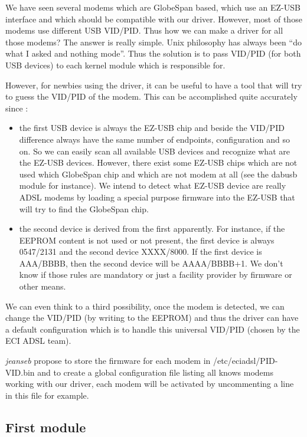 \documentclass[a4paper,12pt]{article}
\begin{document}
We have seen several modems which are GlobeSpan based, which use an
EZ-USB interface and which should be compatible with our driver.
However, most of those modems use different USB VID/PID. Thus how we
can make a driver for all those modems? The answer is really simple.
Unix philosophy has always been ``do what I asked and nothing mode''.
Thus the solution is to pass VID/PID (for both USB devices) to each
kernel module which is responsible for.

However, for newbies using the driver, it can be useful to have a
tool that will try to guess the VID/PID of the modem. This can be
accomplished quite accurately since :

\begin{itemize}
  
\item the first USB device is always the EZ-USB chip and beside the
  VID/PID difference always have the same number of endpoints,
  configuration and so on. So we can easily scan all available USB
  devices and recognize what are the EZ-USB devices. However, there
  exist some EZ-USB chips which are not used which GlobeSpan chip and
  which are not modem at all (see the dabusb module for instance). We
  intend to detect what EZ-USB device are really ADSL modems by loading
  a special purpose firmware into the EZ-USB that will try to find the
  GlobeSpan chip.
  
\item the second device is derived from the first apparently. For
  instance, if the EEPROM content is not used or not present, the
  first device is always 0547/2131 and the second device XXXX/8000. If
  the first device is AAA/BBBB, then the second device will be
  AAAA/BBBB+1. We don't know if those rules are mandatory or just a
  facility provider by firmware or other means.

\end{itemize}

We can even think to a third possibility, once the modem is detected,
we can change the VID/PID (by writing to the EEPROM) and thus the
driver can have a default configuration which is to handle this
universal VID/PID (chosen by the ECI ADSL team).

\textit{jeanseb} propose to store the firmware for each modem in
/etc/eciadsl/PID-VID.bin and to create a global configuration file
listing all knows modems working with our driver, each modem will be
activated by uncommenting a line in this file for example.

\subsection{First module}
\end{document}
